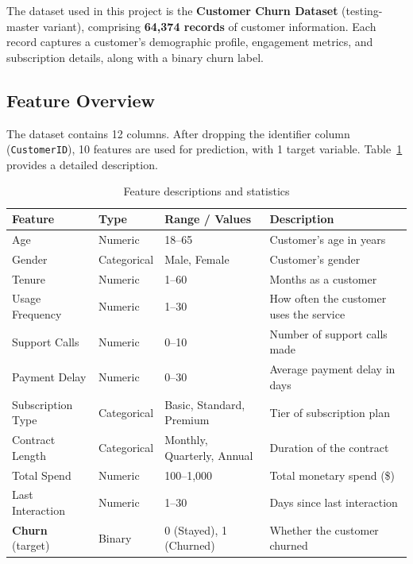 \documentclass[12pt, a4paper]{article}
\begin{document}
The dataset used in this project is the \textbf{Customer Churn Dataset} (testing-master variant), comprising \textbf{64,374 records} of customer information. Each record captures a customer's demographic profile, engagement metrics, and subscription details, along with a binary churn label.

\subsection{Feature Overview}

The dataset contains 12 columns. After dropping the identifier column (\texttt{CustomerID}), 10 features are used for prediction, with 1 target variable. Table~\ref{tab:features} provides a detailed description.

\begin{table}[H]
\centering
\caption{Feature descriptions and statistics}
\label{tab:features}
\renewcommand{\arraystretch}{1.3}
\begin{tabular}{@{} l l l p{5.5cm} @{}}
\toprule
\textbf{Feature} & \textbf{Type} & \textbf{Range / Values} & \textbf{Description} \\
\midrule
Age              & Numeric     & 18--65                         & Customer's age in years \\
Gender           & Categorical & Male, Female                   & Customer's gender \\
Tenure           & Numeric     & 1--60                          & Months as a customer \\
Usage Frequency  & Numeric     & 1--30                          & How often the customer uses the service \\
Support Calls    & Numeric     & 0--10                          & Number of support calls made \\
Payment Delay    & Numeric     & 0--30                          & Average payment delay in days \\
Subscription Type & Categorical & Basic, Standard, Premium      & Tier of subscription plan \\
Contract Length  & Categorical & Monthly, Quarterly, Annual     & Duration of the contract \\
Total Spend      & Numeric     & 100--1,000                     & Total monetary spend (\$) \\
Last Interaction & Numeric     & 1--30                          & Days since last interaction \\
\midrule
\textbf{Churn} (target) & Binary & 0 (Stayed), 1 (Churned) & Whether the customer churned \\
\bottomrule
\end{tabular}
\end{table}
\end{document}
